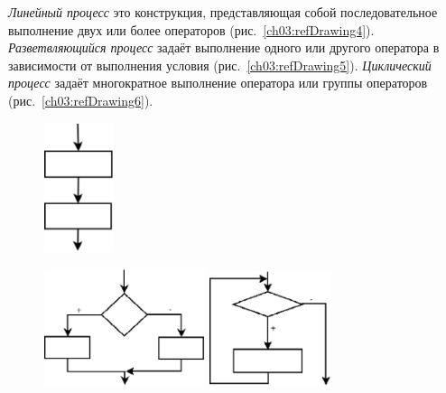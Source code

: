 \emph{Линейный процесс} это конструкция, представляющая собой последовательное
выполнение двух или более операторов (рис.~\ref{ch03:refDrawing4}).
\emph{Разветвляющийся процесс} задаёт выполнение одного или другого
оператора в зависимости от выполнения условия (рис.~\ref{ch03:refDrawing5}).
\emph{Циклический процесс} задаёт многократное выполнение оператора или группы
операторов (рис.~\ref{ch03:refDrawing6}).

{\footnotesize
   \begin{figure}%
   \begin{floatrow}[3]
   \captionnamefont{\footnotesize}
   {\includegraphics[width=0.18\textwidth,keepaspectratio]{img/ris_3_5}}%

   {\includegraphics[width=0.42\textwidth,keepaspectratio]{img/ris_3_6}}%
   {\includegraphics[width=0.32\textwidth,keepaspectratio]{img/ris_3_7}}%
   \end{floatrow}
   \end{figure}%
}


